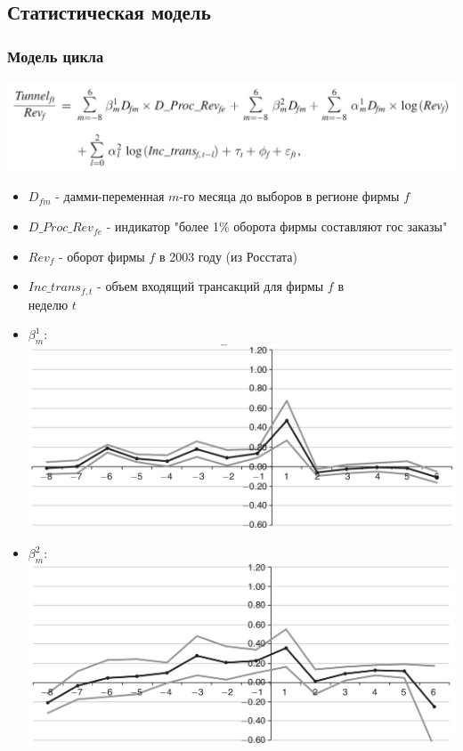 \subsection{Статистическая модель}

\begin{frame}
\frametitle{Модель цикла}
\includegraphics[scale=0.18]{images/cycle1}
\begin{itemize}
	\item $D_{fm}$ - дамми-переменная $m$-го месяца до выборов в регионе фирмы $f$
	\item $D\_Proc\_Rev_{fe}$ - индикатор "более 1\% оборота фирмы составляют гос заказы"
	\item $Rev_{f}$ - оборот фирмы $f$ в 2003 году (из Росстата)
	\item $Inc\_trans_{f,t}$ - объем входящий трансакций для фирмы $f$ в \\неделю $t$
\end{itemize}
\end{frame}

\begin{frame}
\begin{itemize}
	\item $\beta^1_m$:\\
		\includegraphics[scale=0.15]{images/el_effect_beta1}
	
	\item $\beta^2_m$:\\
		\includegraphics[scale=0.15]{images/el_effect_beta2}
\end{itemize}
\end{frame}



